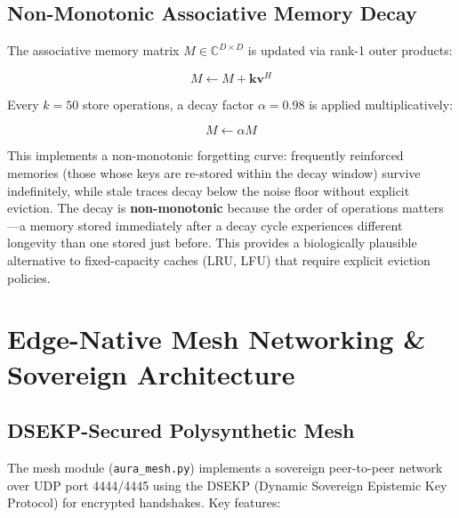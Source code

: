 \documentclass[11pt]{article}
\begin{document}
\subsection{Non-Monotonic Associative Memory Decay}

The associative memory matrix $M \in \mathbb{C}^{D \times D}$ is updated via rank-1 outer products:

\begin{equation}
M \leftarrow M + \mathbf{k}\mathbf{v}^H
\end{equation}

Every $k = 50$ store operations, a decay factor $\alpha = 0.98$ is applied multiplicatively:

\begin{equation}
M \leftarrow \alpha M
\end{equation}

This implements a non-monotonic forgetting curve: frequently reinforced memories (those whose keys are re-stored within the decay window) survive indefinitely, while stale traces decay below the noise floor without explicit eviction. The decay is \textbf{non-monotonic} because the order of operations matters—a memory stored immediately after a decay cycle experiences different longevity than one stored just before. This provides a biologically plausible alternative to fixed-capacity caches (LRU, LFU) that require explicit eviction policies.

\section{Edge-Native Mesh Networking \& Sovereign Architecture}

\subsection{DSEKP-Secured Polysynthetic Mesh}

The mesh module (\texttt{aura\_mesh.py}) implements a sovereign peer-to-peer network over UDP port 4444/4445 using the DSEKP (Dynamic Sovereign Epistemic Key Protocol) for encrypted handshakes. Key features:
\end{document}
